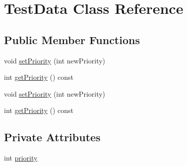 \hypertarget{class_test_data}{\section{\-Test\-Data \-Class \-Reference}
\label{class_test_data}
}
\subsection*{\-Public \-Member \-Functions}
\begin{DoxyCompactItemize}
\item 
void \hyperlink{class_test_data_af6c76355a3ab75cd07ca6bba7dfe2115}{set\-Priority} (int new\-Priority)
\item 
int \hyperlink{class_test_data_a11f3f060f167d1989c94bf94860aed20}{get\-Priority} () const 
\item 
void \hyperlink{class_test_data_af6c76355a3ab75cd07ca6bba7dfe2115}{set\-Priority} (int new\-Priority)
\item 
int \hyperlink{class_test_data_a11f3f060f167d1989c94bf94860aed20}{get\-Priority} () const 
\end{DoxyCompactItemize}
\subsection*{\-Private \-Attributes}
\begin{DoxyCompactItemize}
\item 
int \hyperlink{class_test_data_a2aa3dc886a21401ecc0e6ee3c40d7342}{priority}
\end{DoxyCompactItemize}



